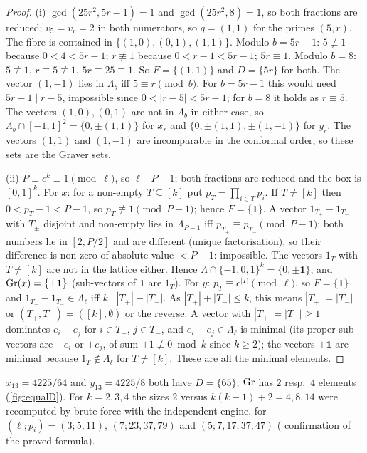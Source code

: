 \begin{proof}
(i) $\gcd(25r^2,5r-1)=1$ and $\gcd(25r^2,8)=1$, so both fractions are reduced; $v_5=v_r=2$ in both numerators, so $q=(1,1)$ for the primes $(5,r)$. The fibre is contained in $\{(1,0),(0,1),(1,1)\}$. Modulo $b=5r-1$: $5\not\equiv1$ because $0<4<5r-1$; $r\not\equiv1$ because $0<r-1<5r-1$; $5r\equiv1$. Modulo $b=8$: $5\not\equiv1$, $r\equiv5\not\equiv1$, $5r\equiv25\equiv1$. So $F=\{(1,1)\}$ and $D=\{5r\}$ for both. The vector $(1,-1)$ lies in $\Lambda_b$ iff $5\equiv r\pmod b$. For $b=5r-1$ this would need $5r-1\mid r-5$, impossible since $0<|r-5|<5r-1$; for $b=8$ it holds as $r\equiv5$. The vectors $(1,0),(0,1)$ are not in $\Lambda_b$ in either case, so $\Lambda_b\cap[-1,1]^2=\{0,\pm(1,1)\}$ for $x_r$ and $\{0,\pm(1,1),\pm(1,-1)\}$ for $y_r$. The vectors $(1,1)$ and $(1,-1)$ are incomparable in the conformal order, so these sets are the Graver sets.

(ii) $P\equiv c^k\equiv1\pmod\ell$, so $\ell\mid P-1$; both fractions are reduced and the box is $[0,1]^k$. For $x$: for a non-empty $T\subseteq[k]$ put $p_T=\prod_{i\in T}p_i$. If $T\ne[k]$ then $0<p_T-1<P-1$, so $p_T\not\equiv1\pmod{P-1}$; hence $F=\{\mathbf 1\}$. A vector $1_{T_+}-1_{T_-}$ with $T_\pm$ disjoint and non-empty lies in $\Lambda_{P-1}$ iff $p_{T_+}\equiv p_{T_-}\pmod{P-1}$; both numbers lie in $[2,P/2]$ and are different (unique factorisation), so their difference is non-zero of absolute value $<P-1$: impossible. The vectors $1_T$ with $T\ne[k]$ are not in the lattice either. Hence $\Lambda\cap\{-1,0,1\}^k=\{0,\pm\mathbf 1\}$, and $\mathrm{Gr}(x)=\{\pm\mathbf 1\}$ (sub-vectors of $\mathbf 1$ are $1_T$). For $y$: $p_T\equiv c^{|T|}\pmod\ell$, so $F=\{\mathbf 1\}$ and $1_{T_+}-1_{T_-}\in\Lambda_\ell$ iff $k\mid|T_+|-|T_-|$. As $|T_+|+|T_-|\le k$, this means $|T_+|=|T_-|$ or $(T_+,T_-)=([k],\emptyset)$ or the reverse. A vector with $|T_+|=|T_-|\ge1$ dominates $e_i-e_j$ for $i\in T_+$, $j\in T_-$, and $e_i-e_j\in\Lambda_\ell$ is minimal (its proper sub-vectors are $\pm e_i$ or $\pm e_j$, of sum $\pm1\not\equiv0\bmod k$ since $k\ge2$); the vectors $\pm\mathbf 1$ are minimal because $1_T\notin\Lambda_\ell$ for $T\ne[k]$. These are all the minimal elements. \qedhere
\end{proof}
\begin{example}[$r=13$]\label{ex:r13}
$x_{13}=4225/64$ and $y_{13}=4225/8$ both have $D=\{65\}$; $\mathrm{Gr}$ has $2$ resp.\ $4$ elements (\cref{fig:equalD}). For $k=2,3,4$ the sizes $2$ versus $k(k-1)+2=4,8,14$ were recomputed by brute force with the independent engine, for $(\ell;p_i)=(3;5,11)$, $(7;23,37,79)$ and $(5;7,17,37,47)$ ( confirmation of the proved formula).
\end{example}

